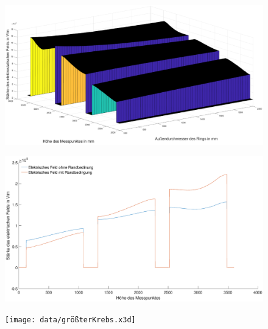 \begin{figure}[h]
	\centering
	\includegraphics[width=\textwidth]{data/3DEtang}
\end{figure}

\begin{figure}[h]
	\centering
	\includegraphics[width=\textwidth]{data/VergleichRandbedingung}
\end{figure}

\begin{figure}[h]
	\centering
	\texttt{[image: data/größterKrebs.x3d]}
\end{figure}